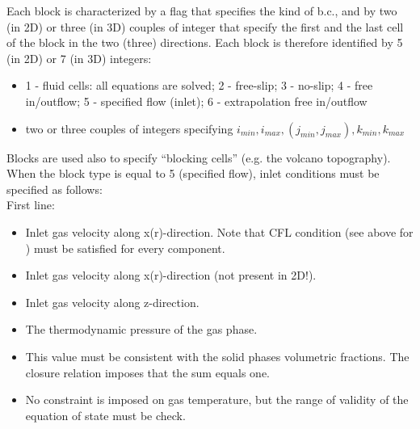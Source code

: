 Each block is characterized
by a flag that specifies the kind of b.c., and by two (in 2D) or three (in 3D)
couples of integer that specify the first and the last cell of the block in 
the two (three) directions. Each block is therefore identified by 5 (in 2D)
or 7 (in 3D) integers:\\

\begin{itemize}
\item
{}
{1 - fluid cells: all equations are solved; 2 - free-slip;
 3 - no-slip; 4 - free in/outflow; 5 - specified flow (inlet); 
 6 - extrapolation free in/outflow}

\item
{}
{two or three couples of integers specifying 
$ i_{min}, i_{max}, (j_{min}, j_{max}), k_{min}, k_{max}$ }

\end{itemize}

Blocks are used also to specify ``blocking cells'' (e.g. 
the volcano topography). When the block type is equal to 5 (specified
flow), inlet conditions must be specified as follows:\\

First line:

\begin{itemize}
\item
{}
{Inlet gas velocity along x(r)-direction. Note that CFL condition (see above for ) 
must be satisfied for every component.}

\item
{}
{Inlet gas velocity along x(r)-direction (not present in 2D!).}

\item
{}
{Inlet gas velocity along z-direction.}

\item
{}
{The thermodynamic pressure of the gas phase.}

\item
{}
{This value must be consistent with the solid phases volumetric fractions.
The closure relation imposes that the sum equals one.}

\item
{}
{No constraint is imposed on gas temperature, but the range of validity
of the equation of state must be check.}
\end{itemize}

